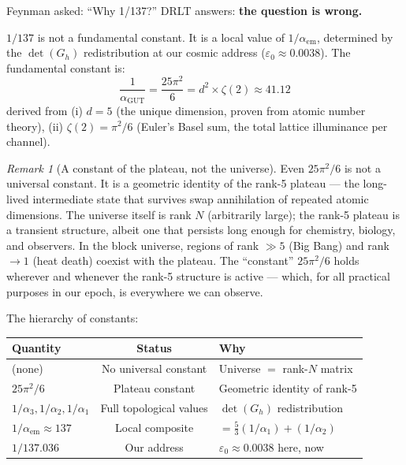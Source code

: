\documentclass[12pt]{article}
\theoremstyle{remark}
\newtheorem{remark}[theorem]{Remark}
\theoremstyle{definition}
\newcommand{\agut}{\alpha_{\mathrm{GUT}}}
\begin{document}
Feynman asked: ``Why 1/137?'' DRLT answers: \textbf{the question is wrong.}

$1/137$ is not a fundamental constant. It is a local value of $1/\alpha_\text{em}$, determined by the $\det(G_h)$ redistribution at our cosmic address ($\varepsilon_0 \approx 0.0038$). The fundamental constant is:
\begin{equation}
\boxed{\frac{1}{\agut} = \frac{25\pi^2}{6} = d^2 \times \zeta(2) \approx 41.12}
\end{equation}
derived from (i) $d = 5$ (the unique dimension, proven from atomic number theory), (ii) $\zeta(2) = \pi^2/6$ (Euler's Basel sum, the total lattice illuminance per channel).

\begin{remark}[A constant of the plateau, not the universe]
Even $25\pi^2/6$ is not a universal constant. It is a geometric identity of the rank-5 plateau --- the long-lived intermediate state that survives swap annihilation of repeated atomic dimensions. The universe itself is rank $N$ (arbitrarily large); the rank-5 plateau is a transient structure, albeit one that persists long enough for chemistry, biology, and observers. In the block universe, regions of rank $\gg 5$ (Big Bang) and rank $\to 1$ (heat death) coexist with the plateau. The ``constant'' $25\pi^2/6$ holds wherever and whenever the rank-5 structure is active --- which, for all practical purposes in our epoch, is everywhere we can observe.

The hierarchy of constants:

\begin{center}
\begin{tabular}{lcl}
\hline
Quantity & Status & Why \\
\hline
(none) & No universal constant & Universe $=$ rank-$N$ matrix \\
$25\pi^2/6$ & Plateau constant & Geometric identity of rank-5 \\
$1/\alpha_3, 1/\alpha_2, 1/\alpha_1$ & Full topological values & $\det(G_h)$ redistribution \\
$1/\alpha_\text{em} \approx 137$ & Local composite & $= \tfrac{5}{3}(1/\alpha_1) + (1/\alpha_2)$ \\
$1/137.036$ & Our address & $\varepsilon_0 \approx 0.0038$ here, now \\
\hline
\end{tabular}
\end{center}
\end{remark}
\end{document}
